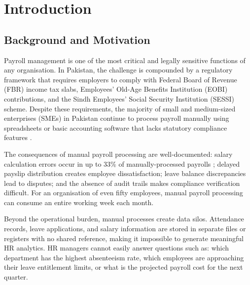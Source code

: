 \documentclass[12pt,a4paper]{report}
\begin{document}
\listoffigures
{}


\pagestyle{fancy}
\fancyhf{}
\fancyhead[L]{\leftmark}
\fancyhead[R]{\thepage}
\renewcommand{\headrulewidth}{0.4pt}

\chapter{Introduction}
\label{chap:introduction}

\section{Background and Motivation}

Payroll management is one of the most critical and legally sensitive functions of any organisation. In Pakistan, the challenge is compounded by a regulatory framework that requires employers to comply with Federal Board of Revenue (FBR) income tax slabs, Employees' Old-Age Benefits Institution (EOBI) contributions, and the Sindh Employees' Social Security Institution (SESSI) scheme. Despite these requirements, the majority of small and medium-sized enterprises (SMEs) in Pakistan continue to process payroll manually using spreadsheets or basic accounting software that lacks statutory compliance features \cite{WorldBank2022}.

The consequences of manual payroll processing are well-documented: salary calculation errors occur in up to 33\% of manually-processed payrolls \cite{APA2023}; delayed payslip distribution creates employee dissatisfaction; leave balance discrepancies lead to disputes; and the absence of audit trails makes compliance verification difficult. For an organisation of even fifty employees, manual payroll processing can consume an entire working week each month.

Beyond the operational burden, manual processes create data silos. Attendance records, leave applications, and salary information are stored in separate files or registers with no shared reference, making it impossible to generate meaningful HR analytics. HR managers cannot easily answer questions such as: which department has the highest absenteeism rate, which employees are approaching their leave entitlement limits, or what is the projected payroll cost for the next quarter.
\end{document}

